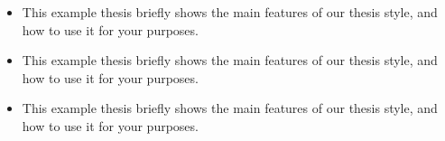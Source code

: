 \begin{itemize}
  \item This example thesis briefly shows the main features of our thesis
  style, and how to use it for your purposes.
  \item This example thesis briefly shows the main features of our thesis
  style, and how to use it for your purposes.
  \item This example thesis briefly shows the main features of our thesis
  style, and how to use it for your purposes.
\end{itemize}

